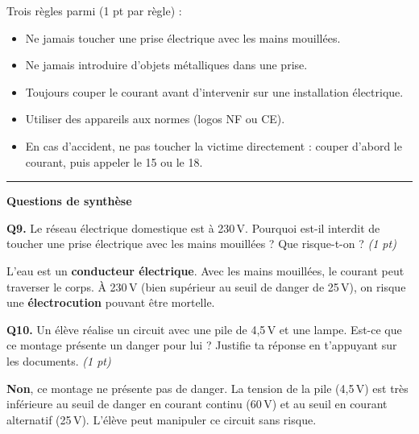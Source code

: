 \documentclass[11pt,a4paper]{article}
\begin{document}
\begin{tcolorbox}[colback=green!5!white,colframe=green!75!black]
Trois règles parmi (1 pt par règle) :
\begin{itemize}
  \item Ne jamais toucher une prise électrique avec les mains mouillées.
  \item Ne jamais introduire d'objets métalliques dans une prise.
  \item Toujours couper le courant avant d'intervenir sur une installation électrique.
  \item Utiliser des appareils aux normes (logos NF ou CE).
  \item En cas d'accident, ne pas toucher la victime directement : couper d'abord le courant, puis appeler le 15 ou le 18.
\end{itemize}
\end{tcolorbox}

\vspace{5mm}
\hrule
\vspace{3mm}

\textbf{Questions de synthèse}

\vspace{3mm}

\textbf{Q9.} Le réseau électrique domestique est à 230\,V. Pourquoi est-il interdit de toucher une prise électrique avec les mains mouillées ? Que risque-t-on ? \hfill \textit{(1 pt)}

\begin{tcolorbox}[colback=green!5!white,colframe=green!75!black]
L'eau est un \textbf{conducteur électrique}. Avec les mains mouillées, le courant peut traverser le corps. À 230\,V (bien supérieur au seuil de danger de 25\,V), on risque une \textbf{électrocution} pouvant être mortelle.
\end{tcolorbox}

\vspace{3mm}

\textbf{Q10.} Un élève réalise un circuit avec une pile de 4,5\,V et une lampe. Est-ce que ce montage présente un danger pour lui ? Justifie ta réponse en t'appuyant sur les documents. \hfill \textit{(1 pt)}

\begin{tcolorbox}[colback=green!5!white,colframe=green!75!black]
\textbf{Non}, ce montage ne présente pas de danger. La tension de la pile (4,5\,V) est très inférieure au seuil de danger en courant continu (60\,V) et au seuil en courant alternatif (25\,V). L'élève peut manipuler ce circuit sans risque.
\end{tcolorbox}
\end{document}
